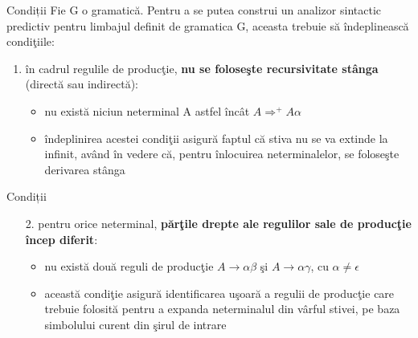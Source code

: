 \documentclass[pdf]{beamer}
\begin{document}
\begin{frame}{Condiții}
Fie G o gramatică. Pentru a se putea construi un analizor sintactic predictiv pentru limbajul definit de gramatica G, aceasta trebuie să îndeplinească condiţiile:

\begin{enumerate}
\item
în cadrul regulile de producţie, \textbf{nu se foloseşte recursivitate stânga }(directă sau indirectă): 

\begin{itemize}
\item
nu există niciun neterminal A astfel încât $A \Rightarrow^+ A\alpha$

\item
îndeplinirea acestei condiţii asigură faptul că stiva nu se va extinde la infinit, având în vedere că, pentru înlocuirea neterminalelor, se foloseşte derivarea stânga
\end{itemize}
\end{enumerate}
\end{frame}



\begin{frame}{Condiții}
\begin{enumerate}
\item[2.]
pentru orice neterminal, \textbf{părţile drepte ale regulilor sale de producţie încep diferit}:

\begin{itemize}
\item
nu există două reguli de producţie $A\to\alpha\beta$ şi $A\to\alpha\gamma$, cu $\alpha \neq \epsilon$

\item
această condiţie asigură identificarea uşoară a regulii de producţie care trebuie folosită pentru a expanda neterminalul din vârful stivei, pe baza simbolului curent din şirul de intrare
\end{itemize}
\end{enumerate}
\end{frame}
\end{document}
